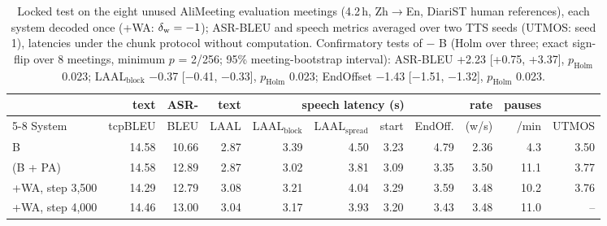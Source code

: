 \begin{table}[t]
\centering\small
\setlength{\tabcolsep}{3.5pt}
\begin{tabular}{lrrrrrrrrrr}
\toprule
 & text & ASR- & text & \multicolumn{4}{c}{speech latency (s)} & rate & pauses & \\
\cmidrule(lr){5-8}
System & tcpBLEU & BLEU & LAAL & LAAL$_\text{block}$ & LAAL$_\text{spread}$ & start & EndOff. & (w/s) & /min & UTMOS \\
\midrule
B & 14.58 & 10.66 & 2.87 & 3.39 & 4.50 & 3.23 & 4.79 & 2.36 & 4.3 & 3.50 \\
\sys{} (B + PA) & 14.58 & 12.89 & 2.87 & 3.02 & 3.81 & 3.09 & 3.35 & 3.50 & 11.1 & 3.77 \\
\sys{}+WA, step 3{,}500 & 14.29 & 12.79 & 3.08 & 3.21 & 4.04 & 3.29 & 3.59 & 3.48 & 10.2 & 3.76 \\
\sys{}+WA, step 4{,}000 & 14.46 & 13.00 & 3.04 & 3.17 & 3.93 & 3.20 & 3.43 & 3.48 & 11.0 & -- \\
\bottomrule
\end{tabular}
\caption{Locked test on the eight unused AliMeeting evaluation meetings (4.2\,h, Zh$\rightarrow$En, DiariST human references), each system decoded once (+WA: $\delta_{\mathrm{w}}=-1$); ASR-BLEU and speech metrics averaged over two TTS seeds (UTMOS: seed 1), latencies under the chunk protocol without computation. Confirmatory tests of \sys{} $-$ B (Holm over three; exact sign-flip over 8 meetings, minimum $p$ = 2/256; 95\% meeting-bootstrap interval): ASR-BLEU +2.23 [+0.75, +3.37], $p_\text{Holm}$ 0.023; LAAL$_\text{block}$ $-$0.37 [$-$0.41, $-$0.33], $p_\text{Holm}$ 0.023; EndOffset $-$1.43 [$-$1.51, $-$1.32], $p_\text{Holm}$ 0.023.}
\label{tab:alieval}
\end{table}
